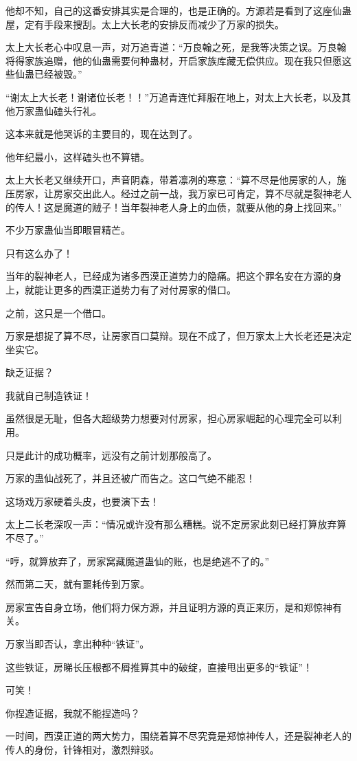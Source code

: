 \begin{this_body}
他却不知，自己的这番安排其实是合理的，也是正确的。方源若是看到了这座仙蛊屋，定有手段来搜刮。太上大长老的安排反而减少了万家的损失。

太上大长老心中叹息一声，对万追青道：“万良翰之死，是我等决策之误。万良翰将得家族追赠，他的仙蛊需要何种蛊材，开启家族库藏无偿供应。现在我只但愿这些仙蛊已经被毁。”

“谢太上大长老！谢诸位长老！！”万追青连忙拜服在地上，对太上大长老，以及其他万家蛊仙磕头行礼。

这本来就是他哭诉的主要目的，现在达到了。

他年纪最小，这样磕头也不算错。

太上大长老又继续开口，声音阴森，带着凛冽的寒意：“算不尽是他房家的人，施压房家，让房家交出此人。经过之前一战，我万家已可肯定，算不尽就是裂神老人的传人！这是魔道的贼子！当年裂神老人身上的血债，就要从他的身上找回来。”

不少万家蛊仙当即眼冒精芒。

只有这么办了！

当年的裂神老人，已经成为诸多西漠正道势力的隐痛。把这个罪名安在方源的身上，就能让更多的西漠正道势力有了对付房家的借口。

之前，这只是一个借口。

万家是想捉了算不尽，让房家百口莫辩。现在不成了，但万家太上大长老还是决定坐实它。

缺乏证据？

我就自己制造铁证！

虽然很是无耻，但各大超级势力想要对付房家，担心房家崛起的心理完全可以利用。

只是此计的成功概率，远没有之前计划那般高了。

万家的蛊仙战死了，并且还被广而告之。这口气绝不能忍！

这场戏万家硬着头皮，也要演下去！

太上二长老深叹一声：“情况或许没有那么糟糕。说不定房家此刻已经打算放弃算不尽了。”

“哼，就算放弃了，房家窝藏魔道蛊仙的账，也是绝逃不了的。”

然而第二天，就有噩耗传到万家。

房家宣告自身立场，他们将力保方源，并且证明方源的真正来历，是和郑惊神有关。

万家当即否认，拿出种种“铁证”。

这些铁证，房睇长压根都不屑推算其中的破绽，直接甩出更多的“铁证”！

可笑！

你捏造证据，我就不能捏造吗？

一时间，西漠正道的两大势力，围绕着算不尽究竟是郑惊神传人，还是裂神老人的传人的身份，针锋相对，激烈辩驳。


\end{this_body}
